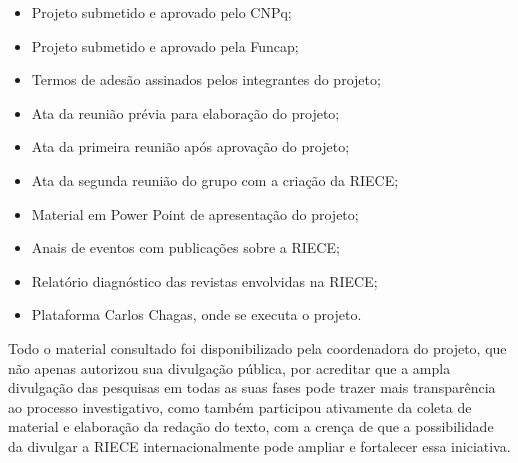 \documentclass[
  a4paper,
]{book}
\providecommand{\tightlist}{%
  \setlength{\itemsep}{0pt}\setlength{\parskip}{0pt}}\usepackage{longtable,booktabs,array}
\begin{document}
\begin{itemize}
\tightlist
\item
  Projeto submetido e aprovado pelo CNPq;
\item
  Projeto submetido e aprovado pela Funcap;
\item
  Termos de adesão assinados pelos integrantes do projeto;
\item
  Ata da reunião prévia para elaboração do projeto;
\item
  Ata da primeira reunião após aprovação do projeto;
\item
  Ata da segunda reunião do grupo com a criação da RIECE;
\item
  Material em Power Point de apresentação do projeto;
\item
  Anais de eventos com publicações sobre a RIECE;
\item
  Relatório diagnóstico das revistas envolvidas na RIECE;
\item
  Plataforma Carlos Chagas, onde se executa o projeto.
\end{itemize}

Todo o material consultado foi disponibilizado pela coordenadora do
projeto, que não apenas autorizou sua divulgação pública, por acreditar
que a ampla divulgação das pesquisas em todas as suas fases pode trazer
mais transparência ao processo investigativo, como também participou
ativamente da coleta de material e elaboração da redação do texto, com a
crença de que a possibilidade da divulgar a RIECE internacionalmente
pode ampliar e fortalecer essa iniciativa.
\end{document}
